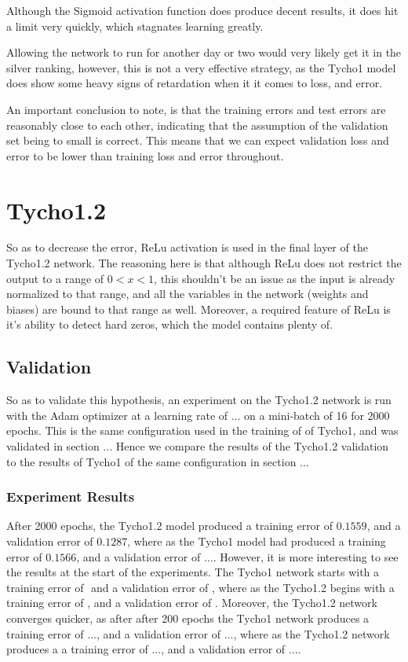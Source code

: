 \documentclass[12pt,a4paper,oneside,oldfontcommands]{memoir}
\begin{document}
Although the Sigmoid activation function does produce decent results, it does hit a limit very quickly, which stagnates
learning greatly.

Allowing the network to run for another day or two would very likely get it in the silver ranking, however, this is not a very effective strategy, as the Tycho1 model does show some heavy signs of retardation when it it comes to loss, and error.

An important conclusion to note, is that the training errors and test errors are reasonably close to each other, indicating that the assumption of the validation set being to small is correct. This means that we can expect validation loss and error to be lower than training loss and error throughout.

\chapter{Tycho1.2}

So as to decrease the error, ReLu activation is used in the final layer of the Tycho1.2 network. The reasoning here is that although ReLu does not restrict the output to a range of \(0 < x < 1\), this shouldn't be an issue as the input is already normalized to that range, and all the variables in the network (weights and biases) are bound to that range as well. Moreover, a required feature of ReLu is it's ability to detect hard zeros, which the model contains plenty of.

\section{Validation}

So as to validate this hypothesis, an experiment on the Tycho1.2 network is run with the Adam optimizer at a learning rate of ... on a mini-batch of 16 for 2000 epochs. This is the same configuration used in the training of of Tycho1, and was validated in section ... Hence we compare the results of the Tycho1.2 validation to the results of Tycho1 of the same configuration in section ...

\subsection{Experiment Results}

After 2000 epochs, the Tycho1.2 model produced a training error of \(0.1559\), and a validation error of \(0.1287\), where as the Tycho1 model had produced a training error of \(0.1566\), and a validation error of \(...\). However, it is more interesting to see the results at the start of the experiments. The Tycho1 network starts with a training error of \(\) and a validation error of \(\), where as the Tycho1.2 begins with a training error of \(\), and a validation error of \(\). Moreover, the Tycho1.2 network converges quicker, as after after 200 epochs the Tycho1 network produces a training error of \(...\), and a validation error of \(...\), where as the Tycho1.2 network produces a a training error of \(...\), and a validation error of \(...\).
\end{document}
